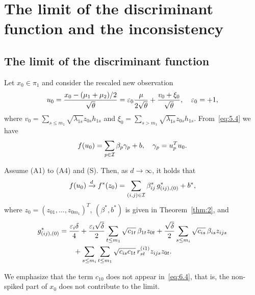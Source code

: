 \section{The limit of the discriminant function and the inconsistency}
\label{sec:disc}

\subsection{The limit of the discriminant function}

Let $x_0\in\pi_1$ and consider the rescaled new observation
\begin{equation}
u_0=\frac{x_0-(\mu_1+\mu_2)/2}{\sqrt{\theta}}
=\varepsilon_0\frac{\mu}{2\sqrt{\theta}}+\frac{v_0+\xi_0}{\sqrt{\theta}},
\quad\varepsilon_0=+1,
\label{eq:6.1}
\end{equation}
where $v_0=\sum_{s\le m_1}\sqrt{\lambda_{1s}}z_{0s}h_{1s}$ and
$\xi_0=\sum_{s>m_1}\sqrt{\lambda_{1s}}z_{0s}h_{1s}$. From~\eqref{eq:5.4} we have
\begin{equation}
f(u_0)=\sum_{p\in\mathcal{I}}\beta_p\gamma_p+b,
\quad\gamma_p=u_p^Tu_0.
\label{eq:6.2}
\end{equation}

\begin{theorem}
\label{thm:3}
Assume \textup{(A1)} to \textup{(A4)} and \textup{(S)}. Then, as $d\to\infty$,
it holds that
\begin{equation}
f(u_0)\xrightarrow{d} f^*(z_0)
=\sum_{(i,j)\in\mathcal{I}}\beta_{ij}^*\,g_{(ij),(0)}^*+b^*,
\label{eq:6.3}
\end{equation}
where $z_0=(z_{01},\dots,z_{0m_1})^T$, $(\beta^*,b^*)$ is given in
Theorem~\ref{thm:2}, and
\begin{equation}
\begin{aligned}
g_{(ij),(0)}^*
&=\frac{\varepsilon_i\delta}{4}
+\frac{\varepsilon_i\sqrt{\delta}}{2}\sum_{t\le m_1}\sqrt{c_{1t}}\,\beta_{1t}z_{0t}
+\frac{\sqrt{\delta}}{2}\sum_{s\le m_i}\sqrt{c_{is}}\,\beta_{is}z_{ijs}\\
&\qquad+\sum_{s\le m_i}\sum_{t\le m_1}\sqrt{c_{is}c_{1t}}\,r_{st}^{(i1)}z_{ijs}z_{0t}.
\end{aligned}
\label{eq:6.4}
\end{equation}
\end{theorem}

We emphasize that the term $c_{10}$ does not appear in~\eqref{eq:6.4}, that is, the
non-spiked part of $x_0$ does not contribute to the limit.

